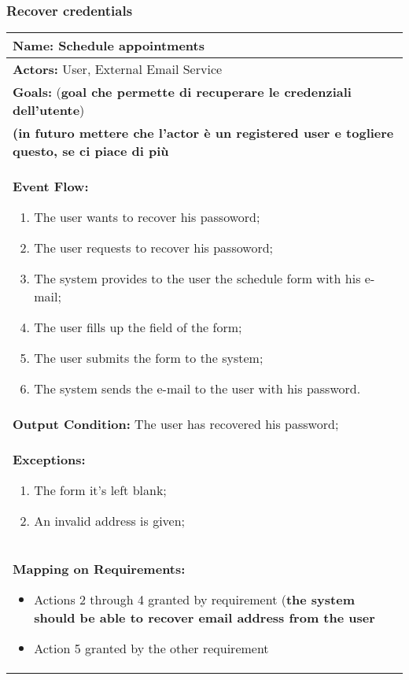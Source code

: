 \subsubsection{Recover credentials}\label{usecase:recovercredentials}
\begin{longtable}{|p{14cm}|} \hline
\textbf{Name:} Schedule appointments \\ \hline
\textbf{Actors:} User, External Email Service \\ \hline
\textbf{Goals:} (\textbf{goal che permette di recuperare le credenziali dell'utente})\\ \hline
\textbf{(\textbf{in futuro mettere che l'actor è un registered user e togliere questo, se ci piace di più}} \\ \hline

\textbf{Event Flow:}
\begin{enumerate}
\item The user wants to recover his passoword;
\item The user requests to recover his passoword;
\item The system provides to the user the schedule form with his e-mail;
\item The user fills up the field of the form;
\item The user submits the form to the system;
\item The system sends the e-mail to the user with his password.
\end{enumerate}
\\ \hline

\textbf{Output Condition:} The user has recovered his password; \\ \hline

\textbf{Exceptions:}
\begin{enumerate}
\item The form it's left blank;
\item An invalid address is given;
\end{enumerate} \\ \hline

\textbf{Mapping on Requirements:}
\begin{itemize}
\item Actions 2 through 4 granted by requirement (\textbf{the system should be able to recover email address from the user}
\item Action 5 granted by the other requirement
\end{itemize}  \\ \hline

\end{longtable}

